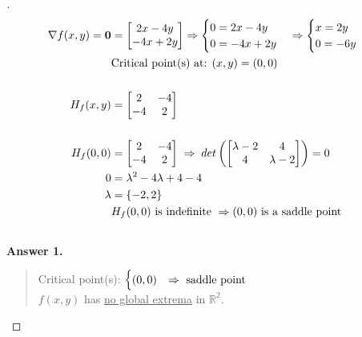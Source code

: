 \documentclass[12pt]{article}
\begin{document}
\begin{proof}[]
	\begin{align*}
		\nabla f(x,y) = \bm{0} &= \begin{bmatrix} 2x - 4y \\ -4x + 2y \end{bmatrix} \Rightarrow
		 \begin{cases} 0 = 2x - 4y \\ 0 = -4x + 2y \end{cases} \Rightarrow
		 \begin{cases} x = 2y \\ 0 = -6y \end{cases} \\
%
		 & \textnormal{Critical point(s) at: } (x,y) = (0,0) \\[15pt]
%
		 H_f(x,y) &= \begin{bmatrix} 2 & -4 \\ -4 & 2 \end{bmatrix} \\[15pt]
%
		 H_f(0,0) &= \begin{bmatrix} 2 & -4 \\ -4 & 2 \end{bmatrix} \; \Rightarrow \; det\left( \begin{bmatrix} \lambda - 2 & 4 \\ 4 & \lambda - 2 \end{bmatrix} \right) = 0 \\
		 0 &= \lambda^2 - 4 \lambda + 4 - 4 \\
		 \lambda &= \left\lbrace -2, 2 \right\rbrace \\
		 & H_f(0,0) \textnormal{ is indefinite } \Rightarrow (0,0) \textnormal{ is a saddle point} \\[15pt]
%
	\end{align*} %
	\textbf{Answer 1.} \vspace{-5mm} \\
	\begin{quote}
		Critical point(s): $ \begin{cases}
			(0,0) & \Rightarrow \textnormal{ saddle point}
		\end{cases}	$ \\
		$f(x,y)$ has \underline{no global extrema} in $\mathbb{R}^2$.
	\end{quote}
\end{proof}
\end{document}
